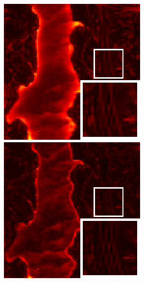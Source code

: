 \begin{figure}[t]
\begin{center}
\begin{minipage}{0.15\hsize}
		\end{minipage}
		\begin{minipage}{0.15\hsize}
			\centerline{\includegraphics[width=\hsize]{./fig_supplement/SAM_map_color_woboundary/JasperRidge/sam_map_STV.eps}} %
		\end{minipage}
		\begin{minipage}{0.15\hsize}
			\centerline{\includegraphics[width=\hsize]{./fig_supplement/SAM_map_color_woboundary/JasperRidge/sam_map_SSST.eps}} %
		\end{minipage}
		\begin{minipage}{0.050\hsize}
			\centerline{\hspace{\hsize}} %
		\end{minipage}
		

\end{center}
\end{figure}
